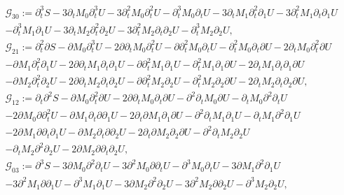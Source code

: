 \documentclass[reqno,11pt]{amsart}
\theoremstyle{plain}
\theoremstyle{definition}
\numberwithin{equation}{section}
\begin{document}
\begin{equation}
    \begin{aligned}
      &  \mathcal{G}_{30}:= \partial_t^3 S-3\partial_t M_0\partial_t^3U-3\partial_t^2 M_0\partial_t^2 U-\partial_t^3 M_0\partial_tU-3\partial_tM_1\partial_t^2\partial_1 U-3\partial_t^2 M_1\partial_t \partial_1 U\\
      & -\partial_t^3 M_1 \partial_1 U-3\partial_t M_2\partial_t^2 \partial_2 U-3\partial_t^2 M_2\partial_t \partial_2U-\partial_t^3 M_2\partial_2U,\\
      & \mathcal{G}_{21}:= \partial_{t}^2 \partial  S-\partial M_0\partial_t^3 U-2\partial \partial_t M_0\partial_t^2 U-\partial \partial_t^2 M_0\partial_t U-\partial_t^2 M_0\partial_t\partial  U-2\partial_tM_0\partial_t^2 \partial  U \\
      &-\partial M_1\partial_t^2\partial_1 U-2\partial \partial_t M_1\partial_t\partial_1 U -\partial \partial_t^2M_1\partial_1 U-\partial_t^2 M_1\partial_1\partial  U-2\partial_tM_1\partial_t\partial_1\partial  U \\
      &-\partial  M_2\partial_t^2\partial_2 U-2\partial \partial_t M_2 \partial_t\partial_2 U- \partial  \partial_t^2 M_2\partial_2 U-\partial_t^2 M_2\partial_2\partial U-2\partial_tM_2\partial_t\partial_2\partial  U,\\
      & \mathcal{G}_{12}:= \partial_t \partial^2 S-\partial M_0\partial_t^2 \partial  U-2\partial \partial_t M_0\partial_t\partial  U-\partial^2 \partial_t M_0 \partial  U-\partial_t M_0\partial^2\partial_t U \\
      & -2\partial M_0\partial \partial_t^2 U-\partial M_1\partial_t\partial \partial_1 U-2\partial_t\partial  M_1\partial_1\partial  U-\partial^2 \partial_t M_1\partial_1 U-\partial_tM_1\partial^2\partial_1 U\\
      &-2\partial  M_1\partial \partial_t\partial_1 U-\partial M_2\partial_t\partial \partial_2 U-2\partial_t\partial  M_2\partial_2\partial  U-\partial^2 \partial_t M_2\partial_2 U\\
      &-\partial_tM_2\partial^2\partial_2 U-2\partial  M_2\partial \partial_t\partial_2 U, \\
      & \mathcal{G}_{03}:= \partial^3 S-3\partial  M_0\partial^2 \partial_t U-3\partial^2 M_0\partial \partial_t U -\partial^3 M_0\partial_t U-3\partial  M_1\partial^2\partial_1 U \\
      &-3\partial^2 M_1 \partial  \partial_1 U -\partial^3 M_1 \partial_1 U-3\partial  M_2\partial^2 \partial_2 U-3\partial^2 M_2\partial  \partial_2 U-\partial^3 M_2\partial_2 U,\\
    \end{aligned}
\end{equation}
\end{document}
